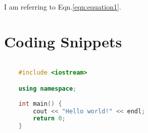 


I am referring to Eqn.\ref{eqn:equation1}.

\section{Coding Snippets}


\lstset{showspaces=false,showstringspaces=false}

\begin{lstlisting}[language=C++,
    keywordstyle=\color{blue}\ttfamily,
    stringstyle=\color{red}\ttfamily,
    commentstyle=\color{mygreen}\ttfamily,
    breaklines=true]

    #include <iostream>

    using namespace;
    
    int main() {
        cout << "Hello world!" << endl;    
        return 0;
    }

\end{lstlisting}